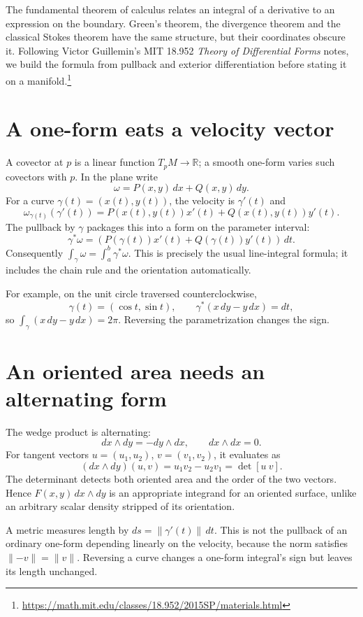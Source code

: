 
The fundamental theorem of calculus relates an integral of a derivative to an expression on the boundary. Green's theorem, the divergence theorem and the classical Stokes theorem have the same structure, but their coordinates obscure it. Following Victor Guillemin's MIT 18.952 \emph{Theory of Differential Forms} notes, we build the formula from pullback and exterior differentiation before stating it on a manifold.\footnote{\url{https://math.mit.edu/classes/18.952/2015SP/materials.html}}

\section{A one-form eats a velocity vector}

A covector at \(p\) is a linear function \(T_pM\to\mathbb R\); a smooth one-form varies such covectors with \(p\). In the plane write
\[
 \omega=P(x,y)\,dx+Q(x,y)\,dy.
\]
For a curve \(\gamma(t)=(x(t),y(t))\), the velocity is \(\gamma'(t)\) and
\[
 \omega_{\gamma(t)}(\gamma'(t))
 =P(x(t),y(t))x'(t)+Q(x(t),y(t))y'(t).
\]
The pullback by \(\gamma\) packages this into a form on the parameter interval:
\[
 \gamma^*\omega=(P(\gamma(t))x'(t)+Q(\gamma(t))y'(t))\,dt.
\]
Consequently \(\int_\gamma\omega=\int_a^b\gamma^*\omega\). This is precisely the usual line-integral formula; it includes the chain rule and the orientation automatically.

For example, on the unit circle traversed counterclockwise,
\[
 \gamma(t)=(\cos t,\sin t),\qquad
 \gamma^*(x\,dy-y\,dx)=dt,
\]
so \(\int_\gamma(x\,dy-y\,dx)=2\pi\). Reversing the parametrization changes the sign.

\section{An oriented area needs an alternating form}

The wedge product is alternating:
\[
 dx\wedge dy=-dy\wedge dx,\qquad dx\wedge dx=0.
\]
For tangent vectors \(u=(u_1,u_2)\), \(v=(v_1,v_2)\), it evaluates as
\[
 (dx\wedge dy)(u,v)=u_1v_2-u_2v_1=\det[u\ v].
\]
The determinant detects both oriented area and the order of the two vectors. Hence \(F(x,y)\,dx\wedge dy\) is an appropriate integrand for an oriented surface, unlike an arbitrary scalar density stripped of its orientation.

A metric measures length by \(ds=\|\gamma'(t)\|\,dt\). This is not the pullback of an ordinary one-form depending linearly on the velocity, because the norm satisfies \(\|{-v}\|=\|v\|\). Reversing a curve changes a one-form integral's sign but leaves its length unchanged.

